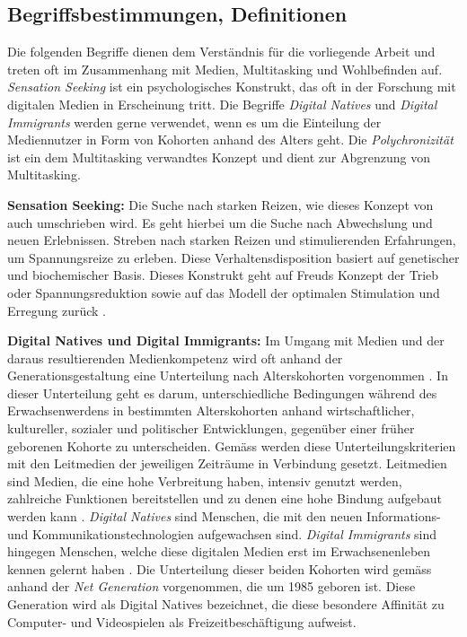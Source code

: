 \subsection{Begriffsbestimmungen, Definitionen}
\label{subsection.begriffsbestimmung}
Die folgenden Begriffe dienen dem Verständnis für die vorliegende Arbeit und treten oft im Zusammenhang mit Medien, Multitasking und Wohlbefinden auf. \textit{Sensation Seeking} ist ein psychologisches Konstrukt, das oft in der Forschung mit digitalen Medien in Erscheinung tritt. Die Begriffe \textit{Digital Natives} und \textit{Digital Immigrants} werden gerne verwendet, wenn es um die Einteilung der Mediennutzer in Form von Kohorten anhand des Alters geht. Die \textit{Polychronizität} ist ein dem Multitasking verwandtes Konzept und dient zur Abgrenzung von Multitasking.   
\par
\textbf{Sensation Seeking:}
Die Suche nach starken Reizen, wie dieses Konzept von  auch umschrieben wird. Es geht hierbei um die Suche nach Abwechslung und neuen Erlebnissen. Streben nach starken Reizen und stimulierenden Erfahrungen, um Spannungsreize zu erleben. Diese Verhaltensdisposition basiert auf genetischer und biochemischer Basis. Dieses Konstrukt geht auf Freuds Konzept der Trieb oder Spannungsreduktion sowie auf das Modell der optimalen Stimulation und Erregung zurück \cite{Doernhaus2014}. 
\par
\textbf{Digital Natives und Digital Immigrants:} Im Umgang mit Medien und der daraus resultierenden Medienkompetenz wird oft anhand der Generationsgestaltung eine Unterteilung nach Alterskohorten vorgenommen \cite{Suss2013}. In dieser Unterteilung geht es darum, unterschiedliche Bedingungen während des Erwachsenwerdens in bestimmten Alterskohorten anhand wirtschaftlicher, kultureller, sozialer und politischer Entwicklungen, gegenüber einer früher geborenen Kohorte zu unterscheiden. Gemäss  werden diese Unterteilungskriterien mit den Leitmedien der jeweiligen Zeiträume in Verbindung gesetzt. Leitmedien sind Medien, die eine hohe Verbreitung haben, intensiv genutzt werden, zahlreiche Funktionen bereitstellen und zu denen eine hohe Bindung aufgebaut werden kann \cite{Suss2013}. \textit{Digital Natives} sind Menschen, die mit den neuen Informations- und Kommunikationstechnologien aufgewachsen sind. \textit{Digital Immigrants} sind hingegen Menschen, welche diese digitalen Medien erst im Erwachsenenleben kennen gelernt haben \cite{Prensky2001}. Die Unterteilung dieser beiden Kohorten wird gemäss  anhand der \textit{Net Generation} vorgenommen, die um 1985 geboren ist. Diese Generation wird als Digital Natives bezeichnet, die diese besondere Affinität zu Computer- und Videospielen als Freizeitbeschäftigung aufweist.
